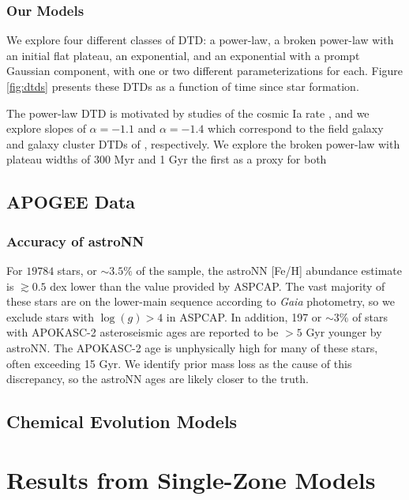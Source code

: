 \documentclass[twocolumn]{aastex631}
\begin{document}
\subsubsection{Our Models}

We explore four different classes of DTD: a power-law, a broken power-law with an initial flat plateau, an exponential, and an exponential with a prompt Gaussian component, with one or two different parameterizations for each. Figure \ref{fig:dtds} presents these DTDs as a function of time since star formation.

The power-law DTD is motivated by studies of the cosmic Ia rate \citep{Maoz2017-CosmicDTD,Wiseman2021-DESRates}, and we explore slopes of $\alpha=-1.1$ and $\alpha=-1.4$ which correspond to the field galaxy and galaxy cluster DTDs of \citet{Maoz2017-CosmicDTD}, respectively. We explore the broken power-law with plateau widths of 300 Myr and 1 Gyr \textemdash the first as a proxy for both 

\subsection{APOGEE Data}
\label{sec:apogee-data}

\subsubsection{Accuracy of astroNN}
\label{sec:astronn-quality}

For $19784$ stars, or $\sim3.5\%$ of the sample, the astroNN [Fe/H] abundance estimate is $\gtrsim0.5$ dex lower than the value provided by ASPCAP. The vast majority of these stars are on the lower-main sequence according to \textit{Gaia} photometry, so we exclude stars with $\log(g) > 4$ in ASPCAP. In addition, 197 or $\sim3\%$ of stars with APOKASC-2 asteroseismic ages are reported to be $>5$ Gyr younger by astroNN. The APOKASC-2 age is unphysically high for many of these stars, often exceeding 15 Gyr. We identify prior mass loss as the cause of this discrepancy, so the astroNN ages are likely closer to the truth.

\subsection{Chemical Evolution Models}
\label{sec:vice-models}

\section{Results from Single-Zone Models}
\label{sec:onezone-results}
\end{document}
